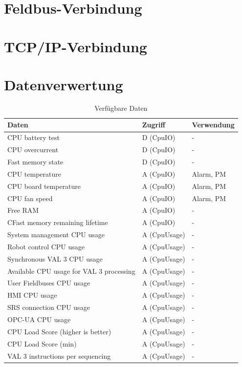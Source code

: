 \documentclass[ a4paper,
                oneside,
                toc=bibliography,
                toc=listof
                ]{scrbook}
\begin{document}
	\section{Feldbus-Verbindung}
	
	\section{TCP/IP-Verbindung}
	
	\section{Datenverwertung}
	
	\begin{longtable}{|p{7cm}|p{3cm}|p{3cm}|}
		\caption{Verfügbare Daten}
		\label{table:Daten}\\
		\hline
		Daten & Zugriff & Verwendung  \\ [0.5ex] 
		\hline
		\endhead
		CPU battery test & D (CpuIO) & -  \\ 
		CPU overcurrent & D (CpuIO) & -  \\
		Fast memory state & D (CpuIO) & - \\
		CPU temperature & A (CpuIO) & Alarm, PM \\
		CPU board temperature & A (CpuIO) & Alarm, PM \\
		CPU fan speed & A (CpuIO) & Alarm, PM \\
		Free RAM & A (CpuIO) & - \\
		CFast memory remaining lifetime & A (CpuIO) & - \\
		\hline
		System management CPU usage & A (CpuUsage) & - \\
		Robot control CPU usage & A (CpuUsage) & - \\			
		Synchronous VAL 3 CPU usage & A (CpuUsage) & - \\
		Available CPU usage for VAL 3 processing& A (CpuUsage) & - \\
		User Fieldbuses CPU usage & A (CpuUsage) & - \\
		HMI CPU usage & A (CpuUsage) & - \\
		SRS connection CPU usage & A (CpuUsage) & - \\
		OPC-UA CPU usage & A (CpuUsage) & - \\
		CPU Load Score (higher is better)& A (CpuUsage) & - \\
		CPU Load Score (min) & A (CpuUsage) & - \\
		VAL 3 instructions per sequencing & A (CpuUsage) & - \\

\end{longtable}
\end{document}
